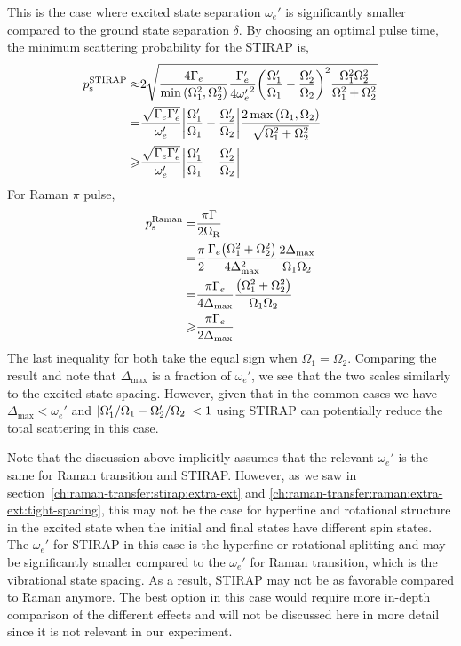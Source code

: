 This is the case where excited state separation $\omega_e'$ is significantly smaller compared
to the ground state separation $\delta$.
By choosing an optimal pulse time, the minimum scattering probability for the STIRAP is,
\begin{align*}
  p_{\mathrm{s}}^{\mathrm{STIRAP}}\approx&2\sqrt{\frac{4\Gamma_e}{\min{\left({\Omega_1^2, \Omega_2^2}\right)}}\frac{\Gamma'_e}{4{\omega'_e}^2}{\left({\frac{\Omega'_1}{\Omega_1}-\frac{\Omega'_2}{\Omega_2}}\right)}^2\frac{\Omega_1^2\Omega_2^2}{\Omega_1^2+\Omega_2^2}}\\
  =&\frac{\sqrt{\Gamma_e\Gamma'_e}}{\omega'_e}
     {\left|{\frac{\Omega'_1}{\Omega_1}-\frac{\Omega'_2}{\Omega_2}}\right|}
     \frac{2\max{\left({\Omega_1, \Omega_2}\right)}}{\sqrt{\Omega_1^2+\Omega_2^2}}\\
  \geqslant&\frac{\sqrt{\Gamma_e\Gamma'_e}}{\omega'_e}
             {\left|{\frac{\Omega'_1}{\Omega_1}-\frac{\Omega'_2}{\Omega_2}}\right|}
\end{align*}
For Raman $\pi$ pulse,
\begin{align*}
  p_{\mathrm{s}}^{\mathrm{Raman}}=&\frac{\pi\Gamma}{2\Omega_{\mathrm{R}}}\\
  =&\frac{\pi}{2}\frac{\Gamma_e{\left({\Omega_1^2+\Omega_2^2}\right)}}{4\Delta_{\max}^2}
     \frac{2\Delta_{\max}}{\Omega_1\Omega_2}\\
  =&\frac{\pi\Gamma_e}{4\Delta_{\max}}\frac{{\left({\Omega_1^2+\Omega_2^2}\right)}}{\Omega_1\Omega_2}\\
  \geqslant&\frac{\pi\Gamma_e}{2\Delta_{\max}}
\end{align*}
The last inequality for both take the equal sign when $\Omega_1=\Omega_2$.
Comparing the result and note that $\Delta_{\max}$ is a fraction of $\omega_e'$,
we see that the two scales similarly to the excited state spacing.
However, given that in the common cases we have $\Delta_{\max}<\omega_e'$ and
${\left|{\Omega'_1/\Omega_1-\Omega'_2/\Omega_2}\right|}<1$ using STIRAP can potentially reduce
the total scattering in this case.

Note that the discussion above implicitly assumes that the relevant $\omega_e'$
is the same for Raman transition and STIRAP.
However, as we saw in section~\ref{ch:raman-transfer:stirap:extra-ext} and
\ref{ch:raman-transfer:raman:extra-ext:tight-spacing},
this may not be the case for hyperfine and rotational structure
in the excited state when the initial and final states have different spin states.
The $\omega_e'$ for STIRAP in this case is the hyperfine or rotational splitting
and may be significantly smaller compared to the $\omega_e'$ for Raman transition,
which is the vibrational state spacing.
As a result, STIRAP may not be as favorable compared to Raman anymore.
The best option in this case would require more in-depth comparison
of the different effects and will not be discussed here in more detail
since it is not relevant in our experiment.

